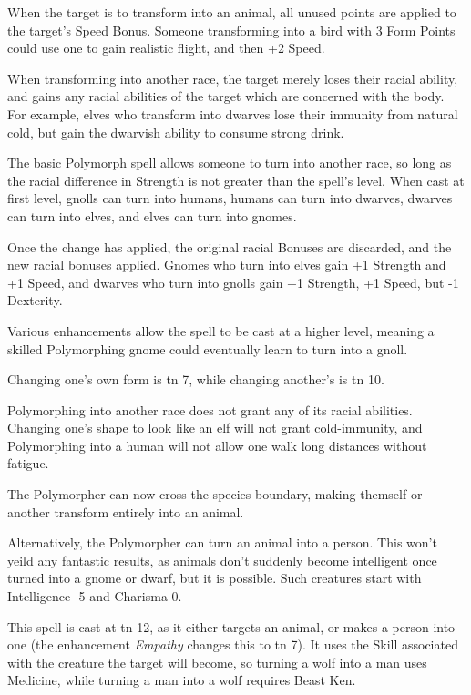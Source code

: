 \begin{multicols}{2}
When the target is to transform into an animal, all unused points are applied to the target's Speed Bonus.  Someone transforming into a bird with 3 Form Points could use one to gain realistic flight, and then +2 Speed.

When transforming into another race, the target merely loses their racial ability, and gains any racial abilities of the target which are concerned with the body.  For example, elves who transform into dwarves lose their immunity from natural cold, but gain the dwarvish ability to consume strong drink.

\spelllevel


\noindent
The basic Polymorph spell allows someone to turn into another race, so long as the racial difference in Strength is not greater than the spell's level.
When cast at first level, gnolls can turn into humans, humans can turn into dwarves, dwarves can turn into elves, and elves can turn into gnomes.

Once the change has applied, the original racial Bonuses are discarded, and the new racial bonuses applied.
Gnomes who turn into elves gain +1 Strength and +1 Speed, and dwarves who turn into gnolls gain +1 Strength, +1 Speed, but -1 Dexterity.

Various enhancements allow the spell to be cast at a higher level, meaning a skilled Polymorphing gnome could eventually learn to turn into a gnoll.

Changing one's own form is \gls{tn} 7, while changing another's is \gls{tn} 10.

Polymorphing into another race does not grant any of its racial abilities.
Changing one's shape to look like an elf will not grant cold-immunity, and Polymorphing into a human will not allow one walk long distances without fatigue.


The Polymorpher can now cross the species boundary, making themself or another transform entirely into an animal.

Alternatively, the Polymorpher can turn an animal into a person.
This won't yeild any fantastic results, as animals don't suddenly become intelligent once turned into a gnome or dwarf, but it is possible.
Such creatures start with Intelligence -5 and Charisma 0.

This spell is cast at \gls{tn} 12, as it either targets an animal, or makes a person into one (the enhancement \textit{Empathy} changes this to \gls{tn} 7).
It uses the Skill associated with the creature the target will become, so turning a wolf into a man uses Medicine, while turning a man into a wolf requires Beast Ken.


\end{multicols}
